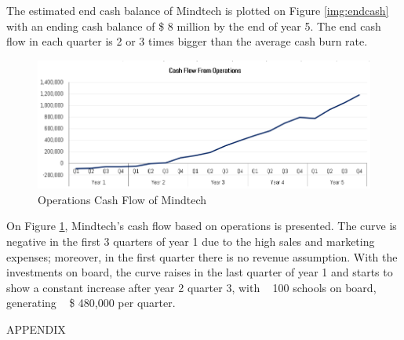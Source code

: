 \documentclass[letterpaper,10pt]{article}
\begin{document}
The estimated end cash balance of Mindtech is plotted on Figure \ref{img:endcash} with an ending cash balance of \$ 8 million by the end of year 5. The end cash flow in each quarter is 2 or 3 times bigger than the average cash burn rate.    

\begin{figure}[!htb]
\centering
\includegraphics[scale=0.6]{cfop.PNG}
\caption{Operations Cash Flow of Mindtech}
\label{img:opreatingcash}
\end{figure}

On Figure \ref{img:opreatingcash}, Mindtech's cash flow based on operations is presented. The curve is negative in the first 3 quarters of year 1 due to the high sales and marketing expenses; moreover, in the first quarter there is no revenue assumption. With the investments on board, the curve raises in the last quarter of year 1 and starts to show a constant increase after year 2 quarter 3, with ~ 100 schools on board, generating ~ \$ 480,000 per quarter.


\newpage
\newpage

\vspace{50mm}

\begin{center}

\uppercase{\Large{Appendix}}

\vspace{20mm}
\end{center}
\end{document}
